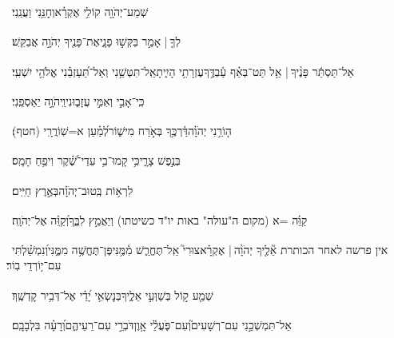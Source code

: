 \documentclass[12pt]{article}
\newcommand{\loc}[1]{\textsuperscript{\locf{#1}}}
\begin{document}
{\loc{ ז}~}‏שְׁמַע־יְהֹוָ֖ה קוֹלִ֥י אֶקְרָ֗א{\hfill}וְחׇנֵּ֥נִי וַעֲנֵֽנִי׃\par

{\loc{ ח}~}‏לְךָ֤ |  אָמַ֣ר  בַּקְּשׁ֣וּ פָנָ֑י{\hfill}אֶת־פָּנֶ֖יךָ יְהֹוָ֣ה אֲבַקֵּֽשׁ׃\par

{\loc{ ט}~}‏אַל־תַּסְתֵּ֬ר פָּנֶ֨יךָ |  {\hfill}אַ֥ל תַּט־בְּאַ֗ף עַ֫בְדֶּ֥ךָ\newline\hspace*{.5em}עֶזְרָתִ֥י הָיִ֑יתָ{\hfill}אַֽל־תִּטְּשֵׁ֥נִי וְאַל־תַּ֝עַזְבֵ֗נִי אֱלֹהֵ֥י יִשְׁעִֽי׃\par

{\loc{ י}~}‏כִּֽי־אָבִ֣י וְאִמִּ֣י עֲזָב֑וּנִי{\hfill}וַֽיהֹוָ֣ה יַאַסְפֵֽנִי׃\par

{\loc{ יא}~}‏ה֤וֹרֵ֥נִי יְהֹוָ֗ה{\hfill}דַּ֫רְכֶּ֥ךָ\newline\hspace*{.5em} בְּאֹ֣רַח מִישׁ֑וֹר{\hfill}לְ֝מַ֗עַן א=שֽׁוֹרֲרָֽי (חטף)׃\par

{\loc{ יב}~}‏ בְּנֶ֣פֶשׁ צָרָ֑י{\hfill}כִּ֥י קָמוּ־בִ֥י עֵדֵי־שֶׁ֝֗קֶר וִיפֵ֥חַ חָמָֽס׃\par

{\loc{ יג}~}‏  לִרְא֥וֹת בְּֽטוּב־יְהֹוָ֗ה{\hfill}בְּאֶ֣רֶץ חַיִּֽים׃\par

{\loc{ יד}~}‏קַוֵּ֗ה =א (מקום ה"עולה" באות יו"ד כשיטתו){\hfill} וְיַאֲמֵ֣ץ לִבֶּ֑ךָ\newline\hspace*{.5em}וְ֝קַוֵּ֗ה אֶל־יְהֹוָֽה׃\par\pend
\ledpb
\pstart[\subsection*{\textcolor{red}{פרק כח}}]\label{פרק כח}
{\loc{ א}~}‏אין פרשה לאחר הכותרת אֵ֘לֶ֤יךָ יְהֹוָ֨ה |  אֶקְרָ֗א\newline\hspace*{.5em}צוּרִי֮ אַֽל־תֶּחֱרַ֢שׁ מִ֫מֶּ֥נִּי{\hfill}פֶּן־תֶּחֱשֶׁ֥ה מִמֶּ֑נִּי{\hfill}וְ֝נִמְשַׁ֗לְתִּי עִם־י֥וֹרְדֵי בֽוֹר׃\par

{\loc{ ב}~}‏שְׁמַ֤ע ק֣וֹל  בְּשַׁוְּעִ֣י אֵלֶ֑יךָ{\hfill}בְּנׇשְׂאִ֥י יָ֝דַ֗י אֶל־דְּבִ֥יר קׇדְשֶֽׁךָ׃\par

{\loc{ ג}~}‏אַל־תִּמְשְׁכֵ֣נִי עִם־רְשָׁעִים֮{\hfill}וְעִם־פֹּ֢עֲלֵ֫י אָ֥וֶן\newline\hspace*{.5em}דֹּבְרֵ֣י  עִם־רֵעֵיהֶ֑ם{\hfill}וְ֝רָעָ֗ה בִּלְבָבָֽם׃\par
\end{document}
